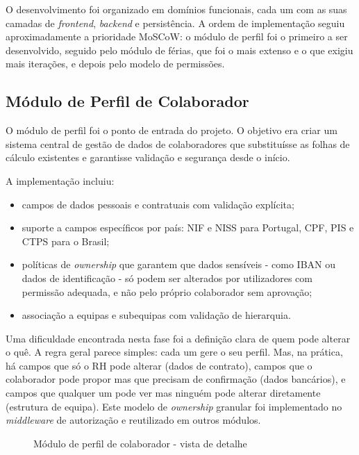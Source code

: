 \documentclass[12pt, a4paper, twoside, openright]{report}
\begin{document}
O desenvolvimento foi organizado em domínios funcionais, cada um com as suas camadas
de \textit{frontend}, \textit{backend} e persistência. A ordem de implementação seguiu
aproximadamente a prioridade MoSCoW: o módulo de perfil foi o primeiro a ser
desenvolvido, seguido pelo módulo de férias, que foi o mais extenso e o que exigiu
mais iterações, e depois pelo modelo de permissões.

\subsection{Módulo de Perfil de Colaborador}

O módulo de perfil foi o ponto de entrada do projeto. O objetivo era criar um sistema
central de gestão de dados de colaboradores que substituísse as folhas de cálculo
existentes e garantisse validação e segurança desde o início.

A implementação incluiu:

\begin{itemize}
  \item campos de dados pessoais e contratuais com validação explícita;
  \item suporte a campos específicos por país: NIF e NISS para Portugal, CPF,
        PIS e CTPS para o Brasil;
  \item políticas de \textit{ownership} que garantem que dados sensíveis - como
        IBAN ou dados de identificação - só podem ser alterados por utilizadores
        com permissão adequada, e não pelo próprio colaborador sem aprovação;
  \item associação a equipas e subequipas com validação de hierarquia.
\end{itemize}

Uma dificuldade encontrada nesta fase foi a definição clara de quem pode alterar o quê.
A regra geral parece simples: cada um gere o seu perfil. Mas, na prática, há campos
que só o RH pode alterar (dados de contrato), campos que o colaborador pode propor mas
que precisam de confirmação (dados bancários), e campos que qualquer um pode ver mas
ninguém pode alterar diretamente (estrutura de equipa). Este modelo de \textit{ownership}
granular foi implementado no \textit{middleware} de autorização e reutilizado em outros
módulos.

\begin{figure}[H]
  \centering
  \caption{Módulo de perfil de colaborador - vista de detalhe}
  \label{fig:perfil}
\end{figure}
\end{document}
